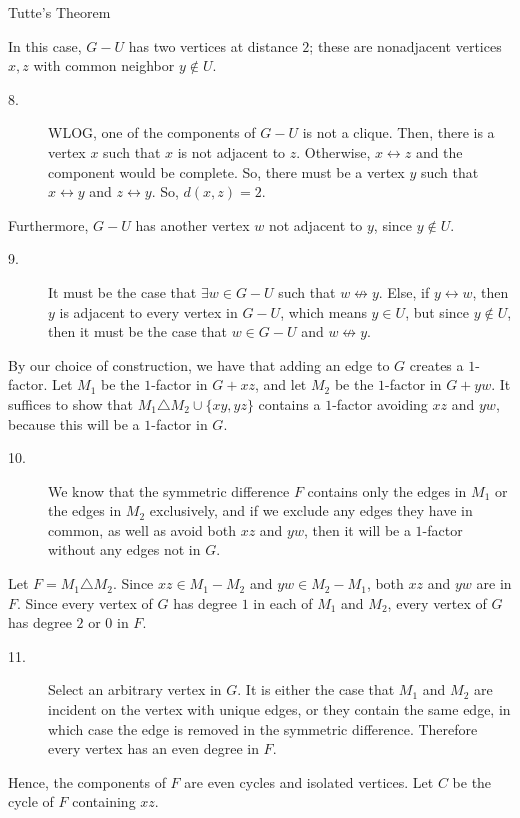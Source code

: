 \documentclass[10pt]{extarticle}
\begin{document}
{\begin{problem}{Tutte's Theorem}
\begin{description}[font=\scshape]
\begin{description}[font=\normalfont\scshape]
\begin{description}
\begin{center}
                \end{center}
            \end{description}
        \end{description}
      \item[Case 2: $G-U$ is not a disjoint union of cliques.] In this case, $G-U$ has two vertices at distance $2$; these are nonadjacent vertices $x,z$ with common neighbor $y\notin U$.
        \begin{description}
          \item[8.] WLOG, one of the components of $G-U$ is not a clique. Then, there is a vertex $x$ such that $x$ is not adjacent to $z$. Otherwise, $x\leftrightarrow z$ and the component would be complete. So, there must be a vertex $y$ such that $x\leftrightarrow y$ and $z\leftrightarrow y$. So, $d(x,z) = 2$.
        \end{description}
        Furthermore, $G-U$ has another vertex $w$ not adjacent to $y$, since $y\notin U$.
        \begin{description}
          \item[9.] It must be the case that $\exists w\in G-U$ such that $w\not\leftrightarrow y$. Else, if $y\leftrightarrow w$, then $y$ is adjacent to every vertex in $G-U$, which means $y\in U$, but since $y\notin U$, then it must be the case that $w\in G-U$ and $w\not\leftrightarrow y$.
        \end{description}
        By our choice of construction, we have that adding an edge to $G$ creates a $1$-factor. Let $M_1$ be the $1$-factor in $G + xz$, and let $M_2$ be the $1$-factor in $G + yw$. It suffices to show that $M_1 \triangle M_2 \cup \{xy,yz\}$ contains a $1$-factor avoiding $xz$ and $yw$, because this will be a $1$-factor in $G$.
        \begin{description}
          \item[10.] We know that the symmetric difference $F$ contains only the edges in $M_1$ or the edges in $M_2$ exclusively, and if we exclude any edges they have in common, as well as avoid both $xz$ and $yw$, then it will be a $1$-factor without any edges not in $G$.
        \end{description}
        Let $F = M_1\triangle M_2$. Since $xz \in M_1 - M_2$ and $yw \in M_2 - M_1$, both $xz$ and $yw$ are in $F$. Since every vertex of $G$ has degree $1$ in each of $M_1$ and $M_2$, every vertex of $G$ has degree $2$ or $0$ in $F$.
        \begin{description}
          \item[11.] Select an arbitrary vertex in $G$. It is either the case that $M_1$ and $M_2$ are incident on the vertex with unique edges, or they contain the same edge, in which case the edge is removed in the symmetric difference. Therefore every vertex has an even degree in $F$.
        \end{description}
        Hence, the components of $F$ are even cycles and isolated vertices. Let $C$ be the cycle of $F$ containing $xz$.\\


\end{description}
\end{problem}}
\end{document}
